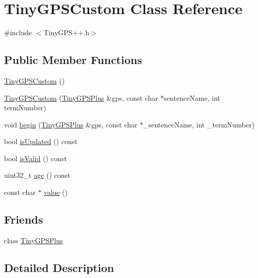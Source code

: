 \hypertarget{class_tiny_g_p_s_custom}{}\section{Tiny\+G\+P\+S\+Custom Class Reference}
\label{class_tiny_g_p_s_custom}


{\ttfamily \#include $<$Tiny\+G\+P\+S++.\+h$>$}

\subsection*{Public Member Functions}
\begin{DoxyCompactItemize}
\item 
\hyperlink{class_tiny_g_p_s_custom_ac82fa99f3bcd9811377dd5fa3e9e98c7}{Tiny\+G\+P\+S\+Custom} ()
\item 
\hyperlink{class_tiny_g_p_s_custom_a29b2a658bf95d8e6265e983b1c0251b5}{Tiny\+G\+P\+S\+Custom} (\hyperlink{class_tiny_g_p_s_plus}{Tiny\+G\+P\+S\+Plus} \&gps, const char $\ast$sentence\+Name, int term\+Number)
\item 
void \hyperlink{class_tiny_g_p_s_custom_a3bf972f7e2e7e3f483071630e5ca8355}{begin} (\hyperlink{class_tiny_g_p_s_plus}{Tiny\+G\+P\+S\+Plus} \&gps, const char $\ast$\+\_\+sentence\+Name, int \+\_\+term\+Number)
\item 
bool \hyperlink{class_tiny_g_p_s_custom_a3905509b3f88d67e248855c135744b14}{is\+Updated} () const 
\item 
bool \hyperlink{class_tiny_g_p_s_custom_a06fad8448c014424bf96ed379b55da21}{is\+Valid} () const 
\item 
uint32\+\_\+t \hyperlink{class_tiny_g_p_s_custom_a9bacaf774b1dba9ad942435d3ed1c2cc}{age} () const 
\item 
const char $\ast$ \hyperlink{class_tiny_g_p_s_custom_ac5ad40a3d9b6fe386b2309f972566674}{value} ()
\end{DoxyCompactItemize}
\subsection*{Friends}
\begin{DoxyCompactItemize}
\item 
class \hyperlink{class_tiny_g_p_s_custom_a6501fd5ef19ae166d43e0e5781609ee2}{Tiny\+G\+P\+S\+Plus}
\end{DoxyCompactItemize}


\subsection{Detailed Description}


